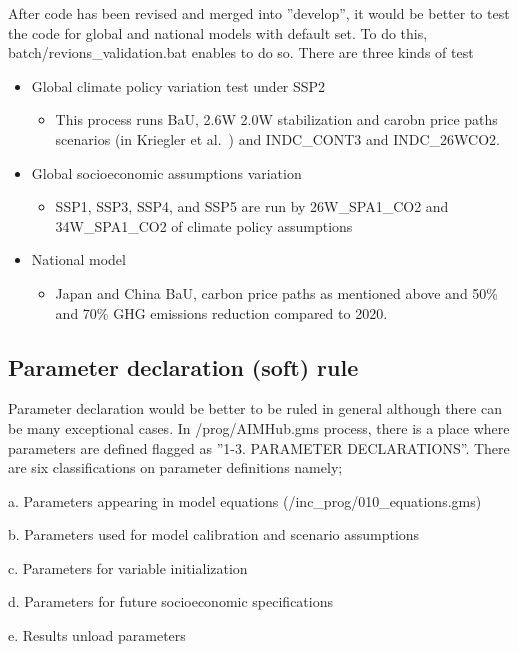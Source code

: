 \documentclass[10pt,a4paper,titlepage,dvipdfmx]{book}
\begin{document}
After code has been revised and merged into ''develop'', it would be better to test the code for global and national models with default set. To do this, batch/revions\_validation.bat enables to do so. There are three kinds of test
\begin{itemize}
\item Global climate policy variation test under SSP2
\begin{itemize}
\item This process runs BaU, 2.6W 2.0W stabilization and carobn price paths scenarios (in Kriegler et al.~\cite{RN2232}) and INDC\_CONT3 and INDC\_26WCO2.
\end{itemize}

\item Global socioeconomic assumptions variation
\begin{itemize}
\item SSP1, SSP3, SSP4, and SSP5 are run by 26W\_SPA1\_CO2 and 34W\_SPA1\_CO2 of climate policy assumptions 
\end{itemize}

\item National model
\begin{itemize}
\item Japan and China BaU, carbon price paths as mentioned above and 50\% and 70\% GHG emissions reduction compared to 2020.
\end{itemize}

\end{itemize}
\subsection{\label{subsec:ParDec}Parameter declaration (soft) rule}

     Parameter declaration would be better to be ruled in general although there can be many exceptional cases. In /prog/AIMHub.gms process, there is a place where parameters are defined flagged as ''1-3. PARAMETER DECLARATIONS''. There are six classifications on parameter definitions namely;

a. Parameters appearing in model equations  (/inc\_prog/010\_equations.gms)

b. Parameters used for model calibration and scenario assumptions

c. Parameters for variable initialization

d. Parameters for future socioeconomic specifications

e. Results unload parameters
\end{document}
